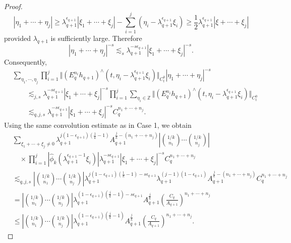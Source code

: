 \documentclass[10pt,a4paper]{amsart}
\newcommand{\Z}{\mathbb Z}
\begin{document}
\begin{proof}
\begin{equation}\label{eq:page29_est}
|\eta_1 +\cdots +\eta_j| \ge \lambda_{q+1}^{\epsilon_{q+1}}|\xi_1+ \cdots +\xi_j| - \sum_{i=1}^j \left(\eta_i-\lambda_{q+1}^{\epsilon_{q+1}}\xi_i\right) \ge \frac12 \lambda_{q+1}^{\epsilon_{q+1}}|\xi+\cdots+\xi_j|
\end{equation}
provided $\lambda_{q+1}$ is sufficiently large. Therefore
\[
|\eta_1 +\cdots +\eta_j|^{-s} \lesssim_s \lambda_{q+1}^{-s\epsilon_{q+1}}|\xi_1 + \cdots +\xi_j|^{-s}.
\]
Consequently,
\[
\begin{aligned}
    &\sum_{\eta_1,\cdots,\eta_j}\prod_{i=1}^j \Vert(E_q^{n_i}h_{q+1})^\wedge(t,\eta_i - \lambda_{q+1}^{\epsilon_{q+1}}\xi_i)\Vert_{C_t^0} |\eta_1 + \cdots + \eta_j|^{-s}\\
    &\qquad \lesssim_{j,s} \lambda_{q+1}^{-s\epsilon_{q+1}}|\xi_1 + \cdots + \xi_j|^{-s} \prod_{i=1}^j \sum_{\eta_i \in \Z} \Vert (E^{n_i}_q h_{q+1})^\wedge (t,\eta_i - \lambda_{q+1}^{\epsilon_{q+1}}\xi_i)\Vert_{C_t^0}\\
    &\qquad \lesssim_{q,j,s} \lambda_{q+1}^{-s\epsilon_{q+1}}|\xi_1 + \cdots + \xi_j|^{-s} C^{n_1+\cdots+n_j}_q.
\end{aligned}
\]
Using the same convolution estimate as in Case 1, we obtain
\begin{equation}\label{eq:page_29_est_3}
    \begin{split}
        &\sum_{\xi_1+\cdots+\xi_j\neq0}
\lambda_{q+1}^{j(1-\epsilon_{q+1})(\frac1k-1)}
A_{q+1}^{\frac jk-(n_1+\cdots+n_j)}
\left|\binom{1/k}{n_1}\cdots\binom{1/k}{n_j}\right|
\\
&\quad\times
\prod_{i=1}^j
\left|
\hat{\phi}_k
\left(\lambda_{q+1}^{\epsilon_{q+1}-1}\xi_i\right)
\right|
\lambda_{q+1}^{-s\epsilon_{q+1}}
|\xi_1+\cdots+\xi_j|^{-s}
C_q^{n_1+\cdots+n_j}
\\
&\lesssim_{q,j,s}
\left|\binom{1/k}{n_1}\cdots\binom{1/k}{n_j}\right|
\lambda_{q+1}^{j(1-\epsilon_{q+1})(\frac1k-1)-s\epsilon_{q+1}}
\lambda_{q+1}^{(j-1)(1-\epsilon_{q+1})}
A_{q+1}^{\frac jk-(n_1+\cdots+n_j)}
C_q^{n_1+\cdots+n_j}
\\
&=
\left|\binom{1/k}{n_1}\cdots\binom{1/k}{n_j}\right|
\lambda_{q+1}^{(1-\epsilon_{q+1})(\frac jk-1)-s\epsilon_{q+1}}
A_{q+1}^{\frac jk}
\left(\frac{C_q}{A_{q+1}}\right)^{n_1+\cdots+n_j}
\\
&\leq
\left|\binom{1/k}{n_1}\cdots\binom{1/k}{n_j}\right|
\lambda_{q+1}^{(1-\epsilon_{q+1})(\frac jk-1)}
A_{q+1}^{\frac jk}
\left(\frac{C_q}{A_{q+1}}\right)^{n_1+\cdots+n_j}.
    \end{split}
\end{equation}


\end{proof}
\end{document}
